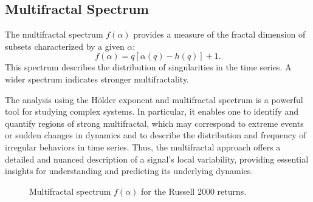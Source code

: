 \documentclass[11pt]{extarticle}
\begin{document}
\subsection{Multifractal Spectrum}
The multifractal spectrum $f(\alpha)$ provides a measure of the fractal dimension of subsets characterized by a given $\alpha$:
\begin{equation}
f(\alpha) = q [\alpha(q) - h(q)] + 1.
\end{equation}
This spectrum describes the distribution of singularities in the time series. A wider spectrum indicates stronger multifractality.

The analysis using the Hölder exponent and multifractal spectrum is a powerful tool for studying complex systems.
In particular, it enables one to identify and quantify regions of strong multifractal, which may correspond to extreme
events or sudden changes in dynamics and to describe the distribution and frequency of irregular behaviors in time series.
Thus, the multifractal approach offers a detailed and nuanced description of a signal's local variability, providing
essential insights for understanding and predicting its underlying dynamics. \\


\begin{figure}[htbp]
    \centering
    \caption{Multifractal spectrum $f(\alpha)$ for the Russell 2000 returns.}
\end{figure}
\end{document}
